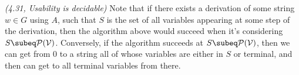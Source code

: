 \begin{problem}{\it(4.31, Usability is decidable)}
Note that if there exists a derivation of some string $w\in G$ using $A$, such that $S$ is the set of all variables appearing at some step of the derivation, then the algorithm above would succeed when it's considering $S\subeq \cal P(V)$. %
Conversely, if the algorithm succeeds at $S\subeq \cal P(V)$, then we can get from 0 to a string all of whose variables are either in $S$ or terminal, and then can get to all terminal variables from there.
\end{problem}

\pagebreak

